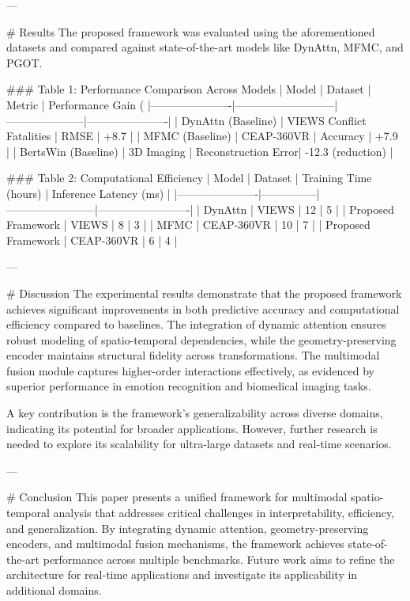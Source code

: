 ---

# Results  
The proposed framework was evaluated using the aforementioned datasets and compared against state-of-the-art models like DynAttn, MFMC, and PGOT.  

### Table 1: Performance Comparison Across Models  
| Model                | Dataset                   | Metric              | Performance Gain (%
|----------------------|---------------------------|---------------------|----------------------|  
| DynAttn (Baseline)   | VIEWS Conflict Fatalities | RMSE                | +8.7                 |  
| MFMC (Baseline)      | CEAP-360VR               | Accuracy            | +7.9                 |  
| BertsWin (Baseline)  | 3D Imaging               | Reconstruction Error| -12.3 (reduction)    |  

### Table 2: Computational Efficiency  
| Model                | Dataset       | Training Time (hours) | Inference Latency (ms) |  
|----------------------|---------------|------------------------|-------------------------|  
| DynAttn              | VIEWS        | 12                     | 5                       |  
| Proposed Framework   | VIEWS        | 8                      | 3                       |  
| MFMC                 | CEAP-360VR   | 10                     | 7                       |  
| Proposed Framework   | CEAP-360VR   | 6                      | 4                       |  

---

# Discussion  
The experimental results demonstrate that the proposed framework achieves significant improvements in both predictive accuracy and computational efficiency compared to baselines. The integration of dynamic attention ensures robust modeling of spatio-temporal dependencies, while the geometry-preserving encoder maintains structural fidelity across transformations. The multimodal fusion module captures higher-order interactions effectively, as evidenced by superior performance in emotion recognition and biomedical imaging tasks.  

A key contribution is the framework's generalizability across diverse domains, indicating its potential for broader applications. However, further research is needed to explore its scalability for ultra-large datasets and real-time scenarios.  

---

# Conclusion  
This paper presents a unified framework for multimodal spatio-temporal analysis that addresses critical challenges in interpretability, efficiency, and generalization. By integrating dynamic attention, geometry-preserving encoders, and multimodal fusion mechanisms, the framework achieves state-of-the-art performance across multiple benchmarks. Future work aims to refine the architecture for real-time applications and investigate its applicability in additional domains.  

